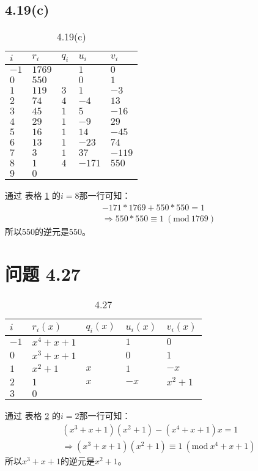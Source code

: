 \documentclass[acmlarge,screen]{acmart}
\begin{document}
\subsection{4.19(c)}
\begin{table}
  \caption{4.19(c)}
  \label{tab:4.19(c)}
  \begin{tabular}{m{5em} m{5em} m{5em} m{5em} m{5em}}
    \toprule
    $i$&$r_i$&$q_i$&$u_i$&$v_i$\\
    \midrule
    $-1$&$1769$&&$1$&$0$\\
    $0$&$550$&&$0$&$1$\\
	$1$&$119$&$3$&$1$&$-3$\\
	$2$&$74$&$4$&$-4$&$13$\\
	$3$&$45$&$1$&$5$&$-16$\\
	$4$&$29$&$1$&$-9$&$29$\\
	$5$&$16$&$1$&$14$&$-45$\\
	$6$&$13$&$1$&$-23$&$74$\\
	$7$&$3$&$1$&$37$&$-119$\\
	$8$&$1$&$4$&$-171$&$550$\\
	$9$&$0$&&&\\
  \bottomrule
\end{tabular}
\end{table}
通过 表格 \ref{tab:4.19(c)} 的$i=8$那一行可知：
\begin{align*}
	-171*1769+550*550=1\\
	\Rightarrow550*550\equiv1\ (\text{mod}\ 1769)
\end{align*}
所以$550$的逆元是$550$。
\section{问题 4.27}
\begin{table}
  \caption{4.27}
  \label{tab:4.27}
  \begin{tabular}{m{5em} m{5em} m{5em} m{5em} m{5em}}
    \toprule
    $i$&$r_i(x)$&$q_i(x)$&$u_i(x)$&$v_i(x)$\\
    \midrule
    $-1$&$x^4+x+1$&&$1$&$0$\\
    $0$&$x^3+x+1$&&$0$&$1$\\
	$1$&$x^2+1$&$x$&$1$&$-x$\\
	$2$&$1$&$x$&$-x$&$x^2+1$\\
	$3$&$0$&&&\\
  \bottomrule
\end{tabular}
\end{table}
通过 表格 \ref{tab:4.27} 的$i=2$那一行可知：
\begin{align*}
	(x^3+x+1)(x^2+1)-(x^4+x+1)x=1\\
	\Rightarrow(x^3+x+1)(x^2+1)\equiv1\ (\text{mod}\ x^4+x+1)
\end{align*}
所以$x^3+x+1$的逆元是$x^2+1$。
\end{document}
